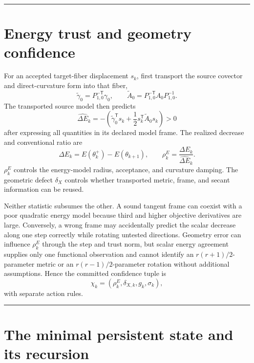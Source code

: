 \documentclass[10pt,twocolumn]{article}
\theoremstyle{definition}
\theoremstyle{remark}
\newcommand{\conceptbreak}{\par\vspace{0.45em}\noindent\textcolor{navy!55}{\rule{\columnwidth}{0.35pt}}\vspace{0.35em}\par}
\begin{document}
\conceptbreak

\section{Energy trust and geometry confidence}
\label{sec:trust}

For an accepted target-fiber displacement $s_k$, first transport the source covector and direct-curvature form into that fiber,
\begin{equation}
 \widetilde\gamma_0=P_{1,0}^{-\mathsf T}\gamma_0,
 \qquad
 \widetilde A_0=P_{1,0}^{-\mathsf T}A_0P_{1,0}^{-1}.
\end{equation}
The transported source model then predicts
\begin{equation}
 \widehat{\Delta E}_k=-\left(\widetilde\gamma_0^{\mathsf T}s_k+\frac12s_k^{\mathsf T}\widetilde A_0s_k\right)>0
 \label{eq:preddecrease}
\end{equation}
after expressing all quantities in its declared model frame.  The realized decrease and conventional ratio are
\begin{equation}
 \Delta E_k=E(\theta_k^+)-E(\theta_{k+1}),\qquad
 \rho_k^E=\frac{\Delta E_k}{\widehat{\Delta E}_k}.
 \label{eq:energyratio}
\end{equation}
$\rho_k^E$ controls the energy-model radius, acceptance, and curvature damping.  The geometric defect $\delta_X$ controls whether transported metric, frame, and secant information can be reused.

Neither statistic subsumes the other.  A sound tangent frame can coexist with a poor quadratic energy model because third and higher objective derivatives are large.  Conversely, a wrong frame may accidentally predict the scalar decrease along one step correctly while rotating untested directions.  Geometry error can influence $\rho_k^E$ through the step and trust norm, but scalar energy agreement supplies only one functional observation and cannot identify an $r(r+1)/2$-parameter metric or an $r(r-1)/2$-parameter rotation without additional assumptions.  Hence the committed confidence tuple is
\begin{equation}
 \chi_k=(\rho_k^E,\delta_{X,k},g_k,\sigma_k),
 \label{eq:confidencepair}
\end{equation}
with separate action rules.

\conceptbreak

\section{The minimal persistent state and its recursion}
\label{sec:recursion}
\end{document}

